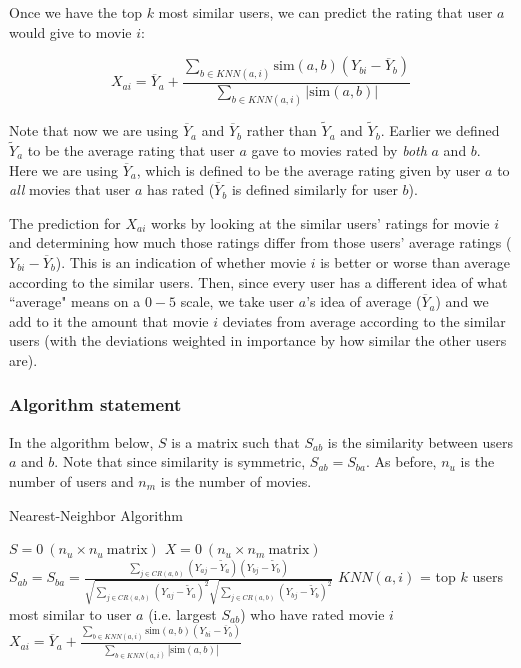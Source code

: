 \documentclass{article}
\begin{document}
Once we have the top $k$ most similar users, we can predict the rating that user $a$ would give to movie $i$:

$$X_{ai} = \overline{Y}_a + \frac{\sum_{b \in KNN(a,i)} \textrm{sim}(a,b) (Y_{bi} - \overline{Y}_b)}{\sum_{b \in KNN(a,i)} |\textrm{sim}(a,b)|}$$

Note that now we are using $\overline{Y}_a$ and $\overline{Y}_b$ rather than $\widetilde{Y}_a$ and $\widetilde{Y}_b$. Earlier we defined $\widetilde{Y}_a$ to be the average rating that user $a$ gave to movies rated by \textit{both} $a$ and $b$. Here we are using $\overline{Y}_a$, which is defined to be the average rating given by user $a$ to \textit{all} movies that user $a$ has rated ($\overline{Y}_b$ is defined similarly for user $b$).

The prediction for $X_{ai}$ works by looking at the similar users' ratings for movie $i$ and determining how much those ratings differ from those users' average ratings ($Y_{bi} - \overline{Y}_b$). This is an indication of whether movie $i$ is better or worse than average according to the similar users. Then, since every user has a different idea of what ``average" means on a $0-5$ scale, we take user $a$'s idea of average ($\overline{Y}_a$) and we add to it the amount that movie $i$ deviates from average according to the similar users (with the deviations weighted in importance by how similar the other users are).

\subsubsection{Algorithm statement}

In the algorithm below, $S$ is a matrix such that $S_{ab}$ is the similarity between users $a$ and $b$. Note that since similarity is symmetric, $S_{ab} = S_{ba}$. As before, $n_u$ is the number of users and $n_m$ is the number of movies.

\begin{algorithm}[H]
    \caption{Nearest-Neighbor Algorithm}
    \label{perceptron}
    
    \begin{algorithmic}[1]
        \State $S = 0\ (n_u \times n_u\ \textrm{matrix})$
        \State $X = 0\ (n_u \times n_m\ \textrm{matrix})$
                \State $S_{ab} = S_{ba} = \frac{\sum_{j \in CR(a,b)} (Y_{aj} - \widetilde{Y}_a)(Y_{bj} - \widetilde{Y}_b)}{\sqrt{\sum_{j \in CR(a,b)} (Y_{aj} - \widetilde{Y}_a)^2} \sqrt{\sum_{j \in CR(a,b)} (Y_{bj} - \widetilde{Y}_b)^2}}$
            \EndFor
        \EndFor
                \State $KNN(a,i)$ = top $k$ users most similar to user $a$ (i.e. largest $S_{ab}$) who have rated movie $i$
                \State $X_{ai} = \overline{Y}_a + \frac{\sum_{b \in KNN(a,i)} \textrm{sim}(a,b) (Y_{bi} - \overline{Y}_b)}{\sum_{b \in KNN(a,i)} |\textrm{sim}(a,b)|}$
            \EndFor
        \EndFor
        \State {}
        \EndProcedure
    \end{algorithmic}
\end{algorithm}
\end{document}
